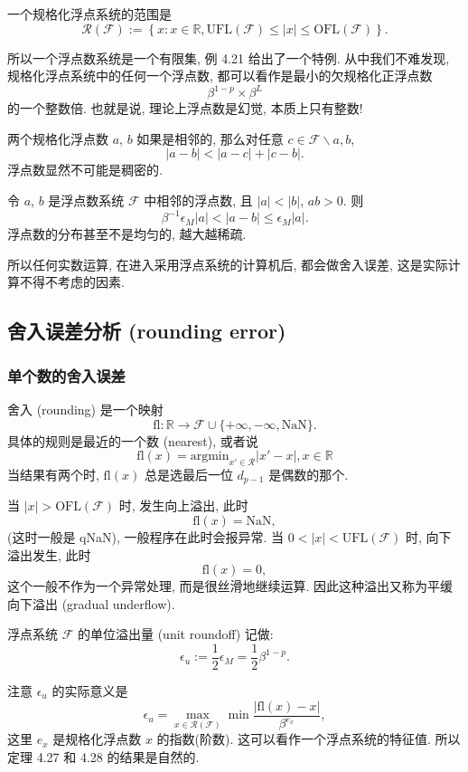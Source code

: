 \documentclass[a4paper]{ctexart}
\begin{document}
{ 一个规格化浮点系统的范围是
$$
\mathscr{R}(\mathscr{F}) := \left\{x : x \in \mathbb{R},
\mbox{UFL}(\mathscr{F}) \leq |x| \leq \mbox{OFL}(\mathscr{F})\right\}.
$$

所以一个浮点数系统是一个有限集, 例 4.21 给出了一个特例. 从中我们不难发现,
规格化浮点系统中的任何一个浮点数, 都可以看作是最小的欠规格化正浮点数
$$
\beta^{1 - p} \times \beta^L
$$
的一个整数倍. 也就是说, 理论上浮点数是幻觉, 本质上只有整数!

 两个规格化浮点数 $a$, $b$ 如果是相邻的,
那么对任意 $c \in \mathscr{F} \backslash {a, b}$,
$$
|a - b| < |a - c| + |c - b|.
$$
浮点数显然不可能是稠密的.

 令 $a$, $b$ 是浮点数系统 $\mathscr{F}$
中相邻的浮点数, 且 $|a| < |b|$, $ab > 0$. 则
$$
\beta^{-1} \epsilon_M |a| < |a - b| \leq \epsilon_M |a|.
$$
浮点数的分布甚至不是均匀的, 越大越稀疏.

所以任何实数运算, 在进入采用浮点系统的计算机后, 都会做舍入误差,
这是实际计算不得不考虑的因素.

\subsection{舍入误差分析 (rounding error)}

\subsubsection{单个数的舍入误差}
 舍入 (rounding) 是一个映射
$$
\mbox{fl} : \mathbb{R} \to \mathscr{F} \cup \{+\infty, -\infty, \mbox{NaN}\}.
$$
具体的规则是最近的一个数 (nearest), 或者说
$$
\mbox{fl}(x) = \mbox{argmin}_{x' \in \mathscr{R}} |x' - x|, x \in \mathbb{R}
$$
当结果有两个时, $\mbox{fl}(x)$ 总是选最后一位 $d_{p - 1}$ 是偶数的那个.

 当 $|x| > \mbox{OFL}(\mathscr{F})$ 时, 发生向上溢出, 此时
$$
\mbox{fl}(x) = \mbox{NaN},
$$
(这时一般是 qNaN), 一般程序在此时会报异常. 当 $0 < |x| < \mbox{UFL}(\mathscr{F})$ 时,
向下溢出发生, 此时
$$
\mbox{fl}(x) = 0,
$$
这个一般不作为一个异常处理, 而是很丝滑地继续运算. 因此这种溢出又称为平缓向下溢出
(gradual underflow).

 浮点系统 $\mathscr{F}$ 的单位溢出量 (unit roundoff) 记做:
$$
\epsilon_u := \frac{1}{2}\epsilon_M = \frac{1}{2}\beta^{1 - p}.
$$

注意 $\epsilon_u$ 的实际意义是
$$
\epsilon_u = \max_{x \in \mathscr{R}(\mathscr{F})}\min
\frac{|\mbox{fl}(x) - x|}{\beta^{e_x}},
$$
这里 $e_x$ 是规格化浮点数 $x$ 的指数(阶数). 这可以看作一个浮点系统的特征值.
所以定理 4.27 和 4.28 的结果是自然的.

}
\end{document}
